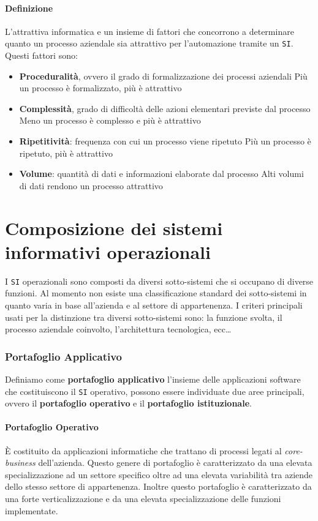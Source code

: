         \paragraph{Definizione} L'attrattiva informatica e un insieme di fattori che concorrono a determinare quanto un processo aziendale sia attrattivo per l'automazione tramite un \texttt{SI}. Questi fattori sono:
        \begin{itemize}
            \item \textbf{Proceduralità}, ovvero il grado di formalizzazione dei processi aziendali
                \subitem Più un processo è formalizzato, più è attrattivo
            \item \textbf{Complessità}, grado di difficoltà delle azioni elementari previste dal processo
                \subitem Meno un processo è complesso e più è attrattivo
            \item \textbf{Ripetitività}: frequenza con cui un processo viene ripetuto
                \subitem Più un processo è ripetuto, più è attrattivo    
            \item \textbf{Volume}: quantità di dati e informazioni elaborate dal processo
                \subitem Alti volumi di dati rendono un processo attrattivo         
        \end{itemize}
\section[Composizione dei \texttt{SI} Operazionali]{Composizione dei sistemi informativi operazionali}
    I \texttt{SI} operazionali sono composti da diversi sotto-sistemi che si occupano di diverse funzioni. Al momento non esiste una classificazione standard dei sotto-sistemi in quanto varia in base all'azienda e al settore di appartenenza. I criteri principali usati per la distinzione tra diversi sotto-sistemi sono: la funzione svolta, il processo aziendale coinvolto, l'architettura tecnologica, ecc\dots
    \subsubsection{Portafoglio Applicativo}
        Definiamo come \textbf{portafoglio applicativo} l'insieme delle applicazioni software che costituiscono il \texttt{SI} operativo, possono essere individuate due aree principali, ovvero il \textbf{portafoglio operativo} e il \textbf{portafoglio istituzionale}.
        \paragraph{Portafoglio Operativo} È costituito da applicazioni informatiche che trattano di processi legati al \textit{core-business} dell'azienda. Questo genere di portafoglio è caratterizzato da una elevata specializzazione ad un settore specifico oltre ad una elevata variabilità tra aziende dello stesso settore di appartenenza. Inoltre questo portafoglio è caratterizzato da una forte verticalizzazione e da una elevata specializzazione delle funzioni implementate.
